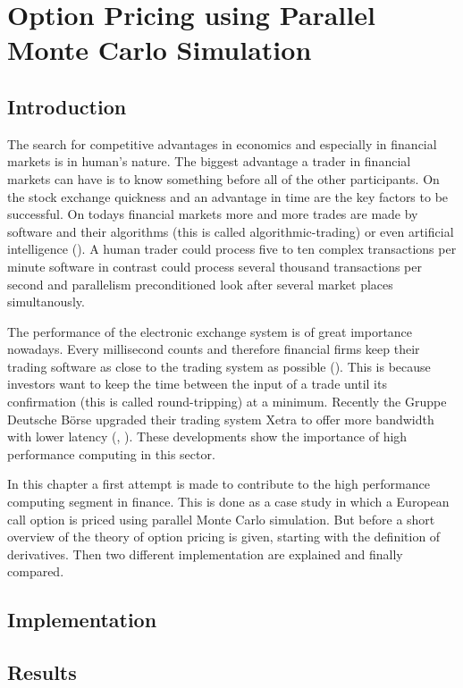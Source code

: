 \chapter{Option Pricing using Parallel Monte Carlo Simulation}
\label{chap:options}
\section{Introduction}
\label{sec:optionintro}

The search for competitive advantages in economics and especially in
financial markets is in human's nature. The biggest advantage a trader
in financial markets can have is to know something before all of the
other participants. On the stock exchange quickness and an advantage
in time are the key factors to be successful. On todays financial
markets more and more trades are made by software and their
algorithms (this is called algorithmic-trading) or even artificial
intelligence (\cite{bloomberg:hal9000}). A human trader could
process five to ten complex 
transactions per minute software in contrast could process several
thousand transactions per second and parallelism preconditioned look
after several market places simultanously.


The performance of the electronic exchange system is of great
importance nowadays. Every millisecond counts and therefore financial
firms keep their trading software as close to the trading system as
possible (\cite{wstonline:cuttingedge}). This is because investors
want to keep the time
between the input of a trade until its confirmation (this is called
round-tripping) at a minimum. Recently the Gruppe Deutsche B\"orse
upgraded their trading 
system Xetra to offer more bandwidth with lower latency (\cite{gdb:latency},
\cite{gdb:bandwidth}).
These developments show the importance of high performance computing
in this sector.


In this chapter a first attempt is made to contribute to the high performance
computing segment in finance. This is done as a case study in which a
European call option is priced using parallel Monte Carlo
simulation. But before a short overview of the theory of option
pricing is given, starting with the definition of derivatives. Then
two different implementation are explained and finally compared.

%
\section{Implementation}
\section{Results}

